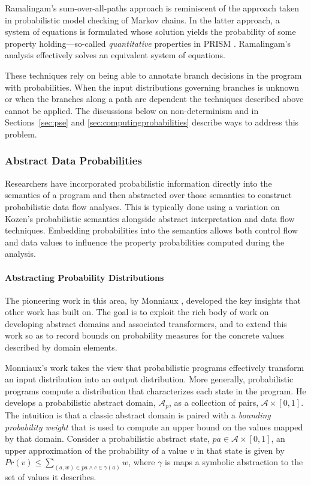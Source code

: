 Ramalingam's sum-over-all-paths approach is reminiscent of
the approach taken in probabilistic model checking of Markov chains.
In the latter approach, a system of equations is formulated
whose solution yields the probability of some property
holding---so-called \textit{quantitative} properties in 
PRISM \cite{kwiatkowska2010advances}.   Ramalingam's analysis
effectively solves an equivalent system of equations.  

These techniques rely on being able to annotate
branch decisions in the program 
with probabilities.  When the input distributions governing
branches is unknown or when the branches along a path are 
dependent the techniques described above cannot be applied.
The discussions below on non-determinism and in Sections~\ref{sec:pse} 
and \ref{sec:computingprobabilities} describe ways
to address this problem.

\subsubsection{Abstract Data Probabilities}
Researchers have incorporated probabilistic information directly into
the semantics of a program and then abstracted over 
those semantics 
\cite{monniaux2000abstract,smith2008probabilistic,cousot2012probabilistic}
to construct probabilistic data flow analyses.
This is typically done using a variation on Kozen's 
probabilistic semantics \cite{kozen1981semantics} 
alongside abstract interpretation and data flow techniques.
Embedding probabilities into the semantics allows 
both control flow and data values to influence
the property probabilities computed during the analysis.

\paragraph{Abstracting Probability Distributions}
The pioneering work in this area, by 
Monniaux \cite{monniaux2000abstract,monniaux2001backwards},
developed the key insights that other work has built on. 
The goal is to exploit the rich body of work on developing
abstract domains and associated transformers, and to extend this work 
so as to record bounds on probability measures for the concrete values
described by domain elements.

Monniaux's work takes the view that probabilistic programs 
effectively transform an input distribution into an output
distribution.  More generally, probabilistic programs compute 
a distribution that characterizes each state in the program.   
He develops a probabilistic abstract domain, $\mathcal{A}_p$, 
as a collection of pairs, $\mathcal{A} \times [0,1]$.
The intuition is that a classic abstract domain is paired
with a \textit{bounding probability weight} that is used
to compute an upper bound on the values mapped by that domain.
Consider a probabilistic abstract state, $pa \in \mathcal{A} \times [0,1]$,
an upper approximation of the probability of a value $v$
in that state is given by
$Pr(v) \le \sum_{(a,w) \in pa \wedge c \in \gamma(a)} w$,
where $\gamma$ is maps a symbolic abstraction to
the set of values it describes.


